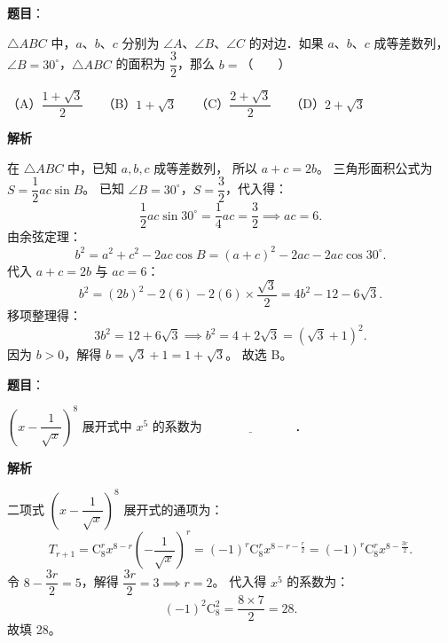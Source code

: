 \begin{answer}

\textbf{题目}：

$\triangle ABC$ 中，$a$、$b$、$c$ 分别为 $\angle A$、$\angle B$、$\angle C$ 的对边．如果 $a$、$b$、$c$ 成等差数列，$\angle B=30^\circ$，$\triangle ABC$ 的面积为 $\dfrac{3}{2}$，那么 $b=$\mbox{（　　）}

（A）$\dfrac{1+\sqrt{3}}{2}$　　（B）$1+\sqrt{3}$　　（C）$\dfrac{2+\sqrt{3}}{2}$　　（D）$2+\sqrt{3}$

\textbf{解析}

在 $\triangle ABC$ 中，已知 $a,b,c$ 成等差数列，
所以 $a+c=2b$。
三角形面积公式为 $S=\dfrac{1}{2}ac\sin B$。
已知 $\angle B=30^\circ$，$S=\dfrac{3}{2}$，代入得：
\nopagebreak[4]
\[
\frac{1}{2}ac\sin 30^\circ=\frac{1}{4}ac=\frac{3}{2}\implies ac=6.
\]
由余弦定理：
\nopagebreak[4]
\[
b^2=a^2+c^2-2ac\cos B=(a+c)^2-2ac-2ac\cos 30^\circ.
\]
代入 $a+c=2b$ 与 $ac=6$：
\nopagebreak[4]
\[
b^2=(2b)^2-2(6)-2(6)\times\frac{\sqrt{3}}{2}=4b^2-12-6\sqrt{3}.
\]
移项整理得：
\nopagebreak[4]
\[
3b^2=12+6\sqrt{3}\implies b^2=4+2\sqrt{3}=(\sqrt{3}+1)^2.
\]
因为 $b>0$，解得 $b=\sqrt{3}+1=1+\sqrt{3}$。
故选 B。


\end{answer}
\begin{answer}

\textbf{题目}：

$\left(x-\dfrac{1}{\sqrt{x}}\right)^8$ 展开式中 $x^5$ 的系数为 $\underline{\hspace{3cm}}$．

\textbf{解析}

二项式 $\left(x-\dfrac{1}{\sqrt{x}}\right)^8$ 展开式的通项为：
\nopagebreak[4]
\[
T_{r+1}=\mathrm{C}_8^r x^{8-r}\left(-\frac{1}{\sqrt{x}}\right)^r=(-1)^r\mathrm{C}_8^r x^{8-r-\frac{r}{2}}=(-1)^r\mathrm{C}_8^r x^{8-\frac{3r}{2}}.
\]
令 $8-\dfrac{3r}{2}=5$，解得 $\dfrac{3r}{2}=3\implies r=2$。
代入得 $x^5$ 的系数为：
\nopagebreak[4]
\[
(-1)^2\mathrm{C}_8^2=\frac{8\times 7}{2}=28.
\]
故填 28。


\end{answer}
